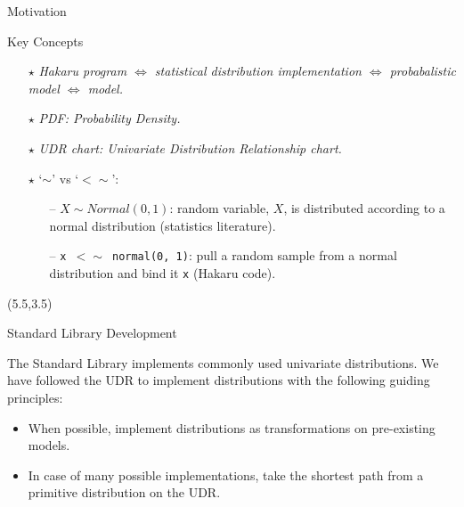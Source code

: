 \documentclass[22pt]{beamer}
\begin{document}
\begin{frame}[fragile]
\begin{textblock}{5}
\begin{block}{\Large{Motivation}}
\end{block}



\begin{block}{\Large{Key Concepts}}
\justifying

\footnotesize{
\begin{itemize}
  \item[\textbf{$\star$}] \textit{Hakaru program $\Longleftrightarrow$ statistical distribution implementation $\Longleftrightarrow$ probabalistic model $\Longleftrightarrow$ model.}
  \item[\textbf{$\star$}] \textit{PDF: Probability Density.}
  \item[\textbf{$\star$}] \textit{UDR chart: Univariate Distribution Relationship chart.}
  \item[\textbf{$\star$}] `{\textbf{$\sim$}}' vs `{\textbf{$<\sim$}}':
      \begin{itemize}
          \footnotesize
          \item[--] \footnotesize{$X \sim Normal(0, 1)$: random variable, $X$, is distributed according to a normal distribution (statistics literature).}
          \item[--] \footnotesize{{\tt \footnotesize{x $<\sim$ normal(0, 1)}}: pull a random sample from a normal distribution and bind it {\tt \footnotesize{x}} (Hakaru code).}
      \end{itemize}

\end{itemize}
}
\end{block}


\begin{textblock}{5}(5.5,3.5)





\begin{block}{\Large{Standard Library Development}}
\justifying

\footnotesize{The Standard Library implements commonly used univariate distributions. We have followed the UDR to implement distributions with the following guiding principles:


\footnotesize{

\bigskip
\begin{itemize}
  \item When possible, implement distributions as transformations on pre-existing models.
  \item In case of many possible implementations, take the shortest path from a primitive distribution on the UDR.
\end{itemize}
        }
}


\end{block}
\end{textblock}
\end{textblock}
\end{frame}
\end{document}
